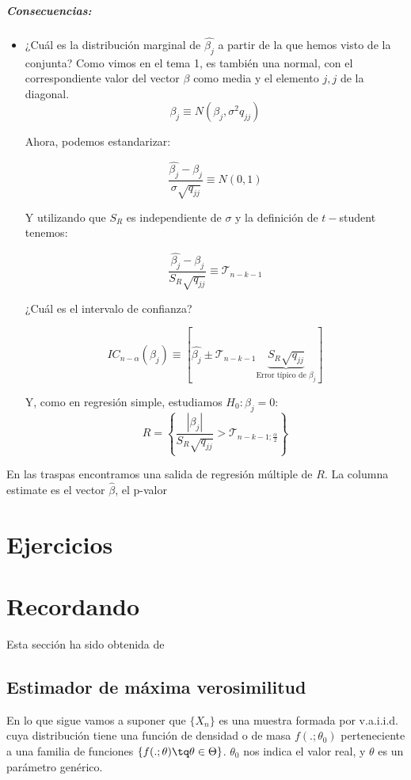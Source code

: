 \documentclass[palatino,nochap]{apuntes}
\begin{document}
\paragraph{Consecuencias:}

\begin{itemize}
	\item ¿Cuál es la distribución marginal de $\hat{β_j}$ a partir de la que hemos visto de la conjunta? Como vimos en el tema 1, es también una normal, con el correspondiente valor del vector $β$ como media y el elemento $j,j$ de la diagonal.
	\[ β_j \equiv N\left(β_j, σ^2q_{jj}\right)\]

	Ahora, podemos estandarizar:

	\[
	\frac{\hat{β_j}-β_j}{σ\sqrt{q_{jj}}} \equiv N(0,1)
	\]

	Y utilizando que $S_R$ es independiente de $σ$ y la definición de $t-$student tenemos:

	\[
	\frac{\hat{β_j}-β_j}{S_R\sqrt{q_{jj}}} \equiv \mathcal{T}_{n-k-1}
	\]

	¿Cuál es el intervalo de confianza?

	\[
		IC_{n-α}(β_j) \equiv \left[\hat{β_j}\pm \mathcal{T}_{n-k-1}\underbrace{S_R\sqrt{q_{jj}}}_{\text{Error típico de }β_j} \right]
	\]

	Y, como en regresión simple, estudiamos $H_0 : β_j = 0$:
	\[
		R = \left\{ \frac{|β_j|}{S_R\sqrt{q_{jj}}} > \mathcal{T}_{n-k-1;\frac{α}{2}} \right\}
	\]
\end{itemize}

En las traspas encontramos una salida de regresión múltiple de $R$. La columna estimate es el vector $\hat{β}$, el p-valor

\appendix
\chapter{Ejercicios}


\chapter{Recordando}
Esta sección ha sido obtenida de \citep{ApuntesEstI}

\section{Estimador de máxima verosimilitud}
\label{sec:estimadorMaximaVerosimilitud}
En lo que sigue vamos a suponer que $\{X_n\}$ es una muestra formada por v.a.i.i.d. cuya distribución tiene una función de densidad o de masa $f(.;\theta_0)$ perteneciente a una familia de funciones $\{f(.;\theta) \tq \theta \in \Theta\}$. $\theta_0$ nos indica el valor real, y $\theta$ es un parámetro genérico.
\end{document}
